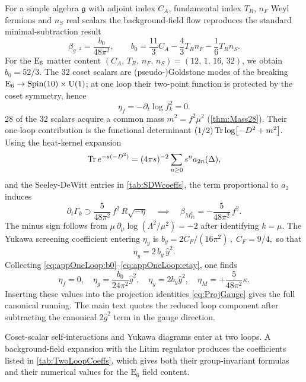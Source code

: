 \documentclass[pdflatex,sn-mathphys-num]{sn-jnl}
\theoremstyle{thmstyleone}
\theoremstyle{thmstylethree}%
\theoremstyle{thmstyletwo}%
\begin{document}
\begin{appendices}
For a simple algebra $\mathfrak g$ with adjoint index
$C_{A}$, fundamental index $T_{R}$, $n_{F}$ Weyl fermions and $n_{S}$
real scalars the background-field flow reproduces the standard
minimal-subtraction result
\begin{equation}\label{eq:appOneLoop:b0}
  \beta_{g^{-2}}
  =
  \frac{b_{0}}{48\pi^{2}},\qquad
  b_{0}=\frac{11}{3}C_{A}-\frac43T_{R}n_{F}-\frac16T_{R}n_{S}.
\end{equation}
For the $\mathrm{E}_{6}$ matter content
\((C_{A},\,T_{R},\,n_{F},\,n_{S})=(12,\,1,\,16,\,32)\), we obtain
$b_{0}=52/3$. The $32$ coset scalars are (pseudo-)Goldstone modes of the
breaking $\mathrm{E}_{6}\to\operatorname{Spin}(10) \times \mathrm{U(1)}$; at one loop their two-point function is
protected by the coset symmetry, hence
\begin{equation}\label{eq:appOneLoop:etaf}
  \eta_{f}=-\partial_{t}\log f^{2}_{k}=0.
\end{equation}
$28$ of the $32$ scalars acquire a common mass
\(m^{2}=f^{2}\mu^{2}\) (\autoref{thm:Mass28}). Their one-loop
contribution is the functional determinant
\(
  (1/2)\operatorname{Tr}\log\bigl[-D^{2}+m^{2}\bigr].
\)
Using the heat-kernel expansion
\[
  \operatorname{Tr} e^{-s(-D^{2})}
   =(4\pi s)^{-2}\sum_{n\ge0}s^{n}a_{2n}(\Delta),
\]
and the Seeley-DeWitt entries in \autoref{tab:SDWcoeffs}, the term
proportional to \(a_{2}\) induces
\begin{equation}\label{eq:appOneLoop:EH}
  \partial_{t}\Gamma_{k}\supset
    \frac{5}{48\pi^{2}}\,
       f^{2}\,R\sqrt{-\eta}
  \quad \implies\quad
    \beta_{M_{\mathrm{Pl}}^{2}}
      =-\frac{5}{48\pi^{2}}\,f^{2}.
\end{equation}
The minus sign follows from
\(
  \mu\,\partial_{\mu}\log(\Lambda^{2}/\mu^{2})=-2
\)
after identifying \(k=\mu\).
The Yukawa screening coefficient entering $\eta_{y}$ is
\(
  b_{y}=2C_{F}/(16\pi^{2})\,,
  \;
  C_{F}=9/4,
\)
so that
\begin{equation}\label{eq:appOneLoop:etay}
  \eta_{y}= 2\,b_{y}\,\hat y^{2}.
\end{equation}
Collecting \eqref{eq:appOneLoop:b0}--\eqref{eq:appOneLoop:etay}, one finds
\[
  \eta_{f}=0,\quad
  \eta_{g}= \frac{b_{0}}{24\pi^{2}}\hat g^{2},\quad
  \eta_{y}= 2b_{y}\hat y^{2},\quad
  \eta_{M}= +\frac{5}{48\pi^{2}}\kappa.
\]
Inserting these values into the projection identities
\eqref{eq:ProjGauge} gives the full canonical running. The main text quotes
the reduced loop component after subtracting the canonical \(2\hat g^{2}\)
term in the gauge direction.

Coset-scalar self-interactions and Yukawa diagrams enter at two loops.
A background-field expansion with the Litim regulator produces the
coefficients listed in \autoref{tab:TwoLoopCoeffs}, which gives both
their group-invariant formulas and their numerical values for the
$\mathrm E_{6}$ field content.


\end{appendices}
\end{document}
